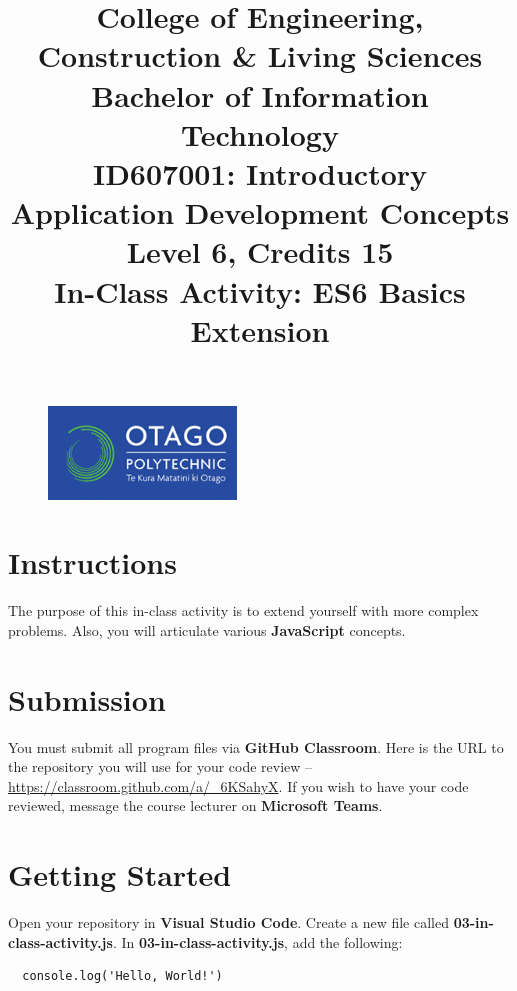 \documentclass{article}
\author{}
\begin{document}
\begin{figure}
  \centering
  \includegraphics[width=50mm]{../img/logo.png}
\end{figure}

\title{College of Engineering, Construction \& Living Sciences\\Bachelor of Information Technology\\ID607001: Introductory Application Development Concepts\\Level 6, Credits 15\\\textbf{In-Class Activity: ES6 Basics Extension}}
\date{}
\maketitle

\section*{Instructions}
The purpose of this in-class activity is to extend yourself with more complex problems. Also, you will articulate various \textbf{JavaScript} concepts.

\section*{Submission}
You must submit all program files via \textbf{GitHub Classroom}. Here is the URL to the repository you will use for your code review – \href{https://classroom.github.com/a/\_6KSahyX}{https://classroom.github.com/a/\_6KSahyX}. If you wish to have your code reviewed, message the course lecturer on \textbf{Microsoft Teams}.

\section*{Getting Started}
Open your repository in \textbf{Visual Studio Code}. Create a new file called \textbf{03-in-class-activity.js}. In \textbf{03-in-class-activity.js}, add the following: 

\begin{verbatim}
  console.log('Hello, World!')
\end{verbatim}
\end{document}
